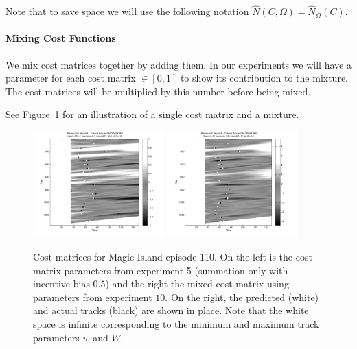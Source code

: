 \documentclass[twocolumn]{article}
\begin{document}
	Note that to save space we will use the following notation $\hat N(C, \Omega)=\hat N_\Omega(C)$.
	
	
	\paragraph{Mixing Cost Functions}
	
	We mix cost matrices together by adding them. In our experiments we will have a parameter for each cost matrix $\in [0,1]$ to show its contribution to the mixture. The cost matrices will be multiplied by this number before being mixed. 
	
	See Figure~\ref{fig:cost_matrices} for an illustration of a single cost matrix and a mixture. 

	\begin{figure}[t]
		\centering
		\includegraphics[width=0.45\textwidth]{images/cm5}
		\includegraphics[width=0.45\textwidth]{images/cm10}
		\caption{Cost matrices for Magic Island episode 110. On the left is the cost matrix parameters from experiment 5 (summation only with incentive bias $0.5$) and the right the mixed cost matrix using parameters from experiment $10$. On the right, the predicted (white) and actual tracks (black) are shown in place. Note that the white space is infinite corresponding to the minimum and maximum track parameters $w$ and $W$.}
		\label{fig:cost_matrices}
	\end{figure} 
	
\end{document}
